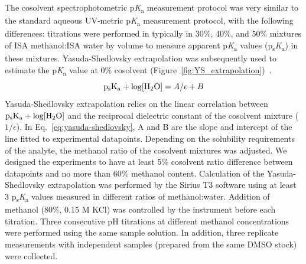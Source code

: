 \documentclass[9pt,lineno]{elife}
\newcommand{\pKa}{p\textit{K}\textsubscript{a}}
\newcommand{\psKa}{p\textsubscript{s}\textit{K}\textsubscript{a}}
\begin{document}
The cosolvent spectrophotometric \pKa{} measurement protocol was very similar to the standard aqueous UV-metric \pKa{} measurement protocol, with the following differences: 
titrations were performed in typically in 30\%, 40\%, and 50\% mixtures of ISA methanol:ISA water by volume to measure apparent \pKa{} values (\psKa) in these mixtures. 
Yasuda-Shedlovsky extrapolation was subsequently used to estimate the \pKa{} value at 0\% cosolvent (Figure~\ref{fig:YS_extrapolation})~\citep{avdeef_ph-metric_1999,doi:10.1021/ac00049a010,TAKACSNOVAK1997235}. 
\begin{equation}
\mathrm{p_{s}K_{a}} + \log [\ce{H2O}]=A/\epsilon+B 
\label{eq:yasuda-shedlovsky}
\end{equation}
Yasuda-Shedlovsky extrapolation relies on the linear correlation between $\mathrm{p_{s}K_{a}} + \log [\ce{H2O}]$ and the reciprocal dielectric constant of the cosolvent mixture ($1/\epsilon$). 
In Eq.~\ref{eq:yasuda-shedlovsky}, A and B are the slope and intercept of the line fitted to experimental datapoints.  
Depending on the solubility requirements of the analyte, the methanol ratio of the cosolvent mixtures was adjusted. 
We designed the experiments to have at least 5\% cosolvent ratio difference between datapoints and no more than 60\% methanol content. 
Calculation of the Yasuda-Shedlovsky extrapolation was performed by the Sirius T3 software using at least 3 \psKa{} values measured in different ratios of methanol:water.
Addition of methanol (80\%, 0.15 M KCl) was controlled by the instrument before each titration. 
Three consecutive pH titrations at different methanol concentrations were performed using the same sample solution. 
In addition, three replicate measurements with independent samples (prepared from the same DMSO stock) were collected.
\end{document}
